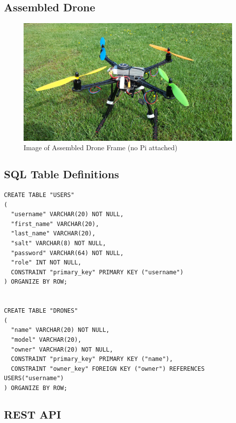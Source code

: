 \documentclass{article}
\begin{document}
\subsection{Assembled Drone}
\begin{figure}[h]
\centering
\caption{Image of Assembled Drone Frame (no Pi attached)\label{AssembledDrone}}
\includegraphics[width=\textwidth]{Drone}
\end{figure}

\subsection{SQL Table Definitions} \label{SQLDefinitions}
\begin{center}
\begin{lstlisting} 
CREATE TABLE "USERS"
(
  "username" VARCHAR(20) NOT NULL,
  "first_name" VARCHAR(20),
  "last_name" VARCHAR(20),
  "salt" VARCHAR(8) NOT NULL,
  "password" VARCHAR(64) NOT NULL,
  "role" INT NOT NULL,
  CONSTRAINT "primary_key" PRIMARY KEY ("username")
) ORGANIZE BY ROW;


CREATE TABLE "DRONES"
(
  "name" VARCHAR(20) NOT NULL,
  "model" VARCHAR(20),
  "owner" VARCHAR(20) NOT NULL,
  CONSTRAINT "primary_key" PRIMARY KEY ("name"),
  CONSTRAINT "owner_key" FOREIGN KEY ("owner") REFERENCES USERS("username")
) ORGANIZE BY ROW;
\end{lstlisting}
\end{center}

\subsection{REST API} \label{apdxRestApi}
\end{document}
